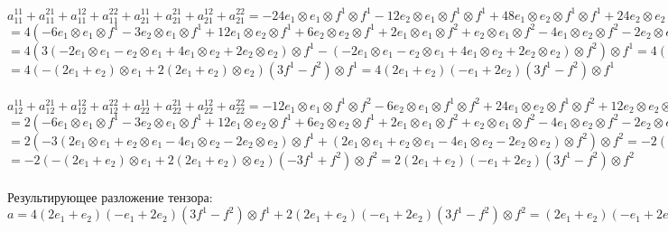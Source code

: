 \documentclass{article}
\newcommand{\ot}{\otimes}
\begin{document}
\begin{center}
$a^{11}_{11} + a^{21}_{11} + a^{12}_{11} + a^{22}_{11} + a^{11}_{21} + a^{21}_{21} + a^{12}_{21} + a^{22}_{21} = -24e_1\ot e_1 \ot f^1 \ot f^1 -12e_2\ot e_1 \ot f^1 \ot f^1 +48e_1\ot e_2 \ot f^1 \ot f^1 + 24e_2\ot e_2 \ot f^1 \ot f^1 + 8e_1\ot e_1 \ot f^2 \ot f^1 + 4e_2\ot e_1 \ot f^2 \ot f^1 - 16e_1\ot e_2 \ot f^2 \ot f^1 - 8e_2\ot e_2 \ot f^2 \ot f^1=$ \\
$= 4\left(-6e_1\ot e_1 \ot f^1 -3e_2\ot e_1 \ot f^1 +12e_1\ot e_2 \ot f^1 + 6e_2\ot e_2 \ot f^1 + 2e_1\ot e_1 \ot f^2 + e_2\ot e_1 \ot f^2 - 4e_1\ot e_2 \ot f^2 - 2e_2\ot e_2 \ot f^2\right)\ot f^1 = $\\
$= 4\left(3\left(-2e_1\ot e_1 -e_2\ot e_1 +4e_1\ot e_2 + 2e_2\ot e_2\right)\ot f^1 - \left(-2e_1\ot e_1 - e_2\ot e_1 + 4e_1\ot e_2 + 2e_2\ot e_2\right)\ot f^2\right)\ot f^1 = 4\left(-2e_1\ot e_1 -e_2\ot e_1 +4e_1\ot e_2 + 2e_2\ot e_2\right)\left(3f^1 - f^2\right)\ot f^1 = $\\
$= 4\left(-\left(2e_1 +e_2\right)\ot e_1 +2\left(2e_1 + e_2\right)\ot e_2\right)\left(3f^1 - f^2\right)\ot f^1 = 4\left(2e_1 +e_2\right)\left(-e_1 +2e_2\right)\left(3f^1 - f^2\right)\ot f^1$\\ \, \\

$a^{11}_{12} + a^{21}_{12} + a^{12}_{12} + a^{22}_{12} + a^{11}_{22} + a^{21}_{22} + a^{12}_{22} + a^{22}_{22} = -12e_1\ot e_1 \ot f^1 \ot f^2 -6e_2\ot e_1 \ot f^1 \ot f^2 +24e_1\ot e_2 \ot f^1 \ot f^2 + 12e_2\ot e_2 \ot f^1 \ot f^2 + 4e_1\ot e_1 \ot f^2 \ot f^2 + 2e_2\ot e_1 \ot f^2 \ot f^2 - 8e_1\ot e_2 \ot f^2 \ot f^2 - 4e_2\ot e_2 \ot f^2 \ot f^2= $ \\
$= 2\left(-6e_1\ot e_1 \ot f^1 -3e_2\ot e_1 \ot f^1 +12e_1\ot e_2 \ot f^1 + 6e_2\ot e_2 \ot f^1 + 2e_1\ot e_1 \ot f^2 + e_2\ot e_1 \ot f^2 - 4e_1\ot e_2 \ot f^2 - 2e_2\ot e_2 \ot f^2\right)\ot f^2 = $\\
$= 2\left(-3\left(2e_1\ot e_1 + e_2\ot e_1 -4e_1\ot e_2 - 2e_2\ot e_2\right)\ot f^1 + \left(2e_1\ot e_1 + e_2\ot e_1 - 4e_1\ot e_2 - 2e_2\ot e_2\right)\ot f^2\right)\ot f^2 = -2\left(2e_1\ot e_1 + e_2\ot e_1 -4e_1\ot e_2 - 2e_2\ot e_2\right)\left(-3f^1 + f^2\right)\ot f^2 = $\\
$= -2\left(-\left(2e_1 +e_2\right)\ot e_1 +2\left(2e_1 + e_2\right)\ot e_2\right)\left(-3f^1 + f^2\right)\ot f^2 = 2\left(2e_1 +e_2\right)\left(-e_1 +2e_2\right)\left(3f^1 - f^2\right)\ot f^2$ \\ \, \\

Результирующее разложение тензора: \\
$a = 4\left(2e_1 +e_2\right)\left(-e_1 +2e_2\right)\left(3f^1 - f^2\right)\ot f^1 + 2\left(2e_1 +e_2\right)\left(-e_1 +2e_2\right)\left(3f^1 - f^2\right)\ot f^2 = \left(2e_1 +e_2\right)\left(-e_1 +2e_2\right)\left(3f^1 - f^2\right)\left(4f^1 +  2f^2\right)$
\end{center}
\end{document}
